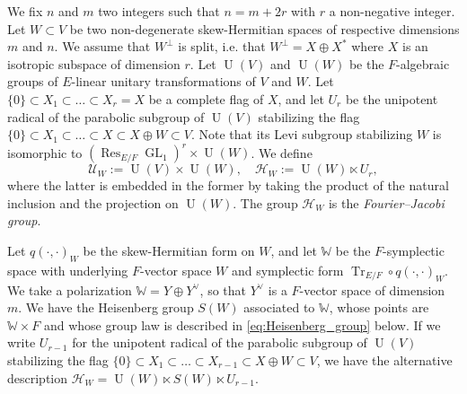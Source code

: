 \documentclass[letterpaper,11pt]{amsart}
\newcommand{\bW}{\mathbb{W}}
\newcommand{\cH}{\mathcal{H}}
\newcommand{\cU}{\mathcal{U}}
\newcommand{\<}{\negthickspace}
\DeclareMathOperator{\Tr}{Tr}
\DeclareMathOperator{\GL}{GL}
\DeclareMathOperator{\U}{U}
\DeclareMathOperator{\Res}{Res}
\theoremstyle{definition}
\theoremstyle{plain}
\theoremstyle{remark}
\numberwithin{equation}{section}
\begin{document}
We fix $n$ and $m$ two integers such that $n=m+2r$ with $r$ a non-negative integer. Let $W \subset V$ be two non-degenerate skew-Hermitian spaces of respective dimensions $m$ and $n$. We assume that $W^\perp$ is split, i.e. that $W^\perp=X \oplus X^*$ where $X$ is an isotropic subspace of dimension $r$. Let $\U(V)$ and $\U(W)$ be the $F$-algebraic groups of $E$-linear unitary transformations of $V$ and $W$. Let $\{0\} \subset X_1 \subset \hdots \subset X_r=X$ be a complete flag of $X$, and let $U_r$ be the unipotent radical of the parabolic subgroup of $\U(V)$ stabilizing the flag $\{0\} \subset X_1 \subset \hdots \subset X \subset X \oplus W \subset V$. Note that its Levi subgroup stabilizing $W$ is isomorphic to $(\Res_{E/F}\GL_1)^r \times \U(W)$. We define 
\begin{equation*}
    \cU_W:=\U(V) \times \U(W), \quad \cH_W:=\U(W) \ltimes U_r,
\end{equation*}
where the latter is embedded in the former by taking the product of the natural inclusion and the projection on $\U(W)$. The group $\cH_W$ is the \emph{Fourier--Jacobi group}.

Let $q(\cdot,\cdot)_W$ be the skew-Hermitian form on $W$, and let $\bW$ be the $F$-symplectic space with underlying $F$-vector space $W$ and symplectic form $\Tr_{E/F} \circ q(\cdot,\cdot)_W$. We take a polarization $\bW=Y \oplus Y^\vee$, so that $Y^\vee$ is a $F$-vector space of dimension $m$. We have the Heisenberg group $S(W)$ associated to $\bW$, whose points are $\bW \times F$ and whose group law is described in \eqref{eq:Heisenberg_group} below. If we write $U_{r-1}$ for the unipotent radical of the parabolic subgroup of $\U(V)$ stabilizing the flag $\{0\} \subset X_1 \subset \hdots \subset X_{r-1} \subset X \oplus W \subset V$, we have the alternative description $\cH_W=\U(W) \ltimes S(W) \ltimes U_{r-1}$. 
\end{document}
